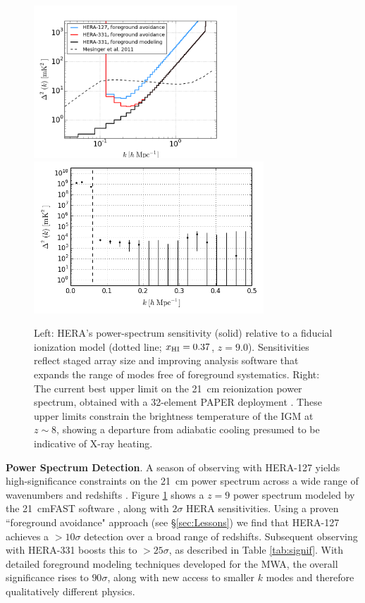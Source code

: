\documentclass[preprint]{aastex}
\newcommand{\Mycitep}[1]{{\bf \citep{#1}}}
\newcommand{\Caption}[4]{\vspace{#1}\renewcommand{\baselinestretch}{#2}\caption{#4}\vspace{#3}}
\def\HI{{H{\small I }}}
\def\xHI{{x_{\rm\HI}}}
\begin{document}
\begin{figure}[t]\centering
\includegraphics[height=2.25in]{plots/Pspec/eor_pspec_2014.png}
\includegraphics[height=2.25in]{plots/Pspec/pk_k3pk.png} 
\Caption{-0.1in}{0.9}{-0.2in}{\small Left: HERA's power-spectrum sensitivity (solid)
relative to a fiducial ionization model (dotted line; $\xHI=0.37$, $z=9.0$).
Sensitivities reflect staged array size and
improving analysis software that expands the range
of modes free of foreground systematics.
Right: The current best upper limit on the 21~cm reionization power spectrum,
obtained with a 32-element PAPER deployment \Mycitep{parsons_et_al2013}.  These upper limits
constrain the brightness temperature of the IGM at $z\sim8$, showing
a departure from adiabatic cooling presumed to be indicative of X-ray heating.
}\label{fig:eor_pspec}
\end{figure}

{\bf Power Spectrum Detection}. A season of observing with HERA-127 yields high-significance constraints on the 21~cm power
spectrum across a wide range of wavenumbers and redshifts \Mycitep{pober_et_al2014}.  
Figure \ref{fig:eor_pspec} shows a $z=9$ power spectrum modeled by the 21~cmFAST software \citep{mesinger_et_al2011},
along with $2\sigma$ HERA sensitivities.  Using a proven ``foreground avoidance" approach (see \S\ref{sec:Lessons})
we find that
HERA-127 achieves a $> 10\sigma$ detection over a broad range of redshifts.
Subsequent observing with HERA-331 boosts this to $>25\sigma$, as described in Table \ref{tab:signif}.  With detailed foreground modeling techniques
developed for the MWA, the overall significance rises to $90\sigma$,
along with new access to smaller $k$ modes and therefore qualitatively different physics.
\end{document}
